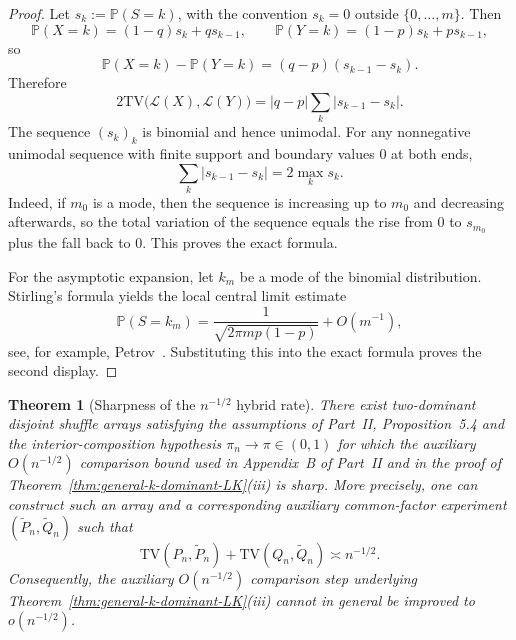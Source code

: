 \documentclass{article}
\newtheorem{theorem}{Theorem}[section]
\newcommand{\TV}{\mathrm{TV}}
\newcommand{\Pbb}{\mathbb P}
\newcommand{\1}{\mathbf 1}
\begin{document}
\begin{proof}
Let $s_k:=\Pbb(S=k)$, with the convention $s_k=0$ outside $\{0,\dots,m\}$. Then
\[
\Pbb(X=k)=(1-q)s_k+qs_{k-1},
\qquad
\Pbb(Y=k)=(1-p)s_k+ps_{k-1},
\]
so
\[
\Pbb(X=k)-\Pbb(Y=k)=(q-p)(s_{k-1}-s_k).
\]
Therefore
\[
2\TV\bigl(\mathcal L(X),\mathcal L(Y)\bigr)
=|q-p|\sum_k |s_{k-1}-s_k|.
\]
The sequence $(s_k)_k$ is binomial and hence unimodal. For any nonnegative unimodal sequence with finite support
and boundary values $0$ at both ends,
\[
\sum_k |s_{k-1}-s_k|=2\max_k s_k.
\]
Indeed, if $m_0$ is a mode, then the sequence is increasing up to $m_0$ and decreasing afterwards, so the total
variation of the sequence equals the rise from $0$ to $s_{m_0}$ plus the fall back to $0$. This proves the exact
formula.

For the asymptotic expansion, let $k_m$ be a mode of the binomial distribution. Stirling's formula yields the local
central limit estimate
\[
\Pbb(S=k_m)=\frac{1}{\sqrt{2\pi mp(1-p)}}+O(m^{-1}),
\]
see, for example, Petrov~\cite[Chapter~VII]{Pet75}. Substituting this into the exact formula proves the second
display.
\end{proof}

\begin{theorem}[Sharpness of the $n^{-1/2}$ hybrid rate]
\label{thm:sharpness-hybrid}
There exist two-dominant disjoint shuffle arrays satisfying the assumptions of Part~II, Proposition~5.4 and the
interior-composition hypothesis $\pi_n\to\pi\in(0,1)$ for which the auxiliary $O(n^{-1/2})$ comparison bound used in
Appendix~B of Part~II and in the proof of Theorem~\ref{thm:general-k-dominant-LK}(iii) is sharp. More precisely, one can construct such an array and a
corresponding auxiliary common-factor experiment $(\widetilde P_n,\widetilde Q_n)$ such that
\[
\TV(P_n,\widetilde P_n)+\TV(Q_n,\widetilde Q_n)\asymp n^{-1/2}.
\]
Consequently, the auxiliary $O(n^{-1/2})$ comparison step underlying Theorem~\ref{thm:general-k-dominant-LK}(iii)
cannot in general be improved to $o(n^{-1/2})$.
\end{theorem}
\end{document}
